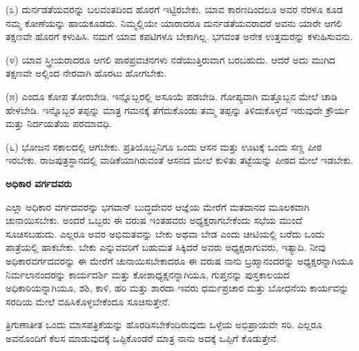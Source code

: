 \vspace{0.15cm}

(೩) ದುರ್ನಡತೆಯವರನ್ನು ಬಲವಂತದಿಂದ ಹೊರಗೆ ಇಟ್ಟಿರಬೇಕು. ಯಾವ ಕಾರಣದಿಂದಲೂ ಅವರ ನೆರಳೂ ಕೂಡ ನಮ್ಮ ಕೋಣೆಯನ್ನು ಹಾಯಕೂಡದು. ನಿಮ್ಮಲ್ಲಿಯೇ ಯಾರಾದರೂ ದುರ್ನಡತೆಯವರಾದರೆ ಅವನು ಯಾರೇ ಆಗಲಿ ತಕ್ಷಣವೇ ಹೊರಗೆ ಕಳುಹಿಸಿ. ನಮಗೆ ಯಾವ ಕಪಟಿಗಳೂ ಬೇಕಾಗಿಲ್ಲ. ಭಗವಂತ ಅನೇಕ ಉತ್ತಮರನ್ನು ಕಳುಹಿಸುವನು.

\vspace{0.15cm}

(೪) ಯಾವ ಸ್ತ್ರೀಯರಾದರೂ ಆಗಲಿ ಪಾಠಪ್ರವಚನಗಳು ನಡೆಯುತ್ತಿರುವಾಗ ಬರಬಹುದು. ಆದರೆ ಅದು ಮುಗಿದ ತಕ್ಷಣವೇ ಅಲ್ಲಿಂದ ನೇರವಾಗಿ ಹೊರಟು ಹೋಗಬೇಕು.

\vspace{0.15cm}

(೫) ಎಂದೂ ಕೋಪ ತೋರಬೇಡಿ. ಇನ್ನೊಬ್ಬರಲ್ಲಿ ಅಸೂಯೆ ಪಡಬೇಡಿ. ಗೋಪ್ಯವಾಗಿ ಮತ್ತೊಬ್ಬನ ಮೇಲೆ ಚಾಡಿ ಹೇಳಬೇಡಿ. ಇನ್ನೊಬ್ಬರ ತಪ್ಪನ್ನು ಮಾತ್ರ ಗಮನಕ್ಕೆ ತೆಗೆದುಕೊಂಡು ತಮ್ಮ ತಪ್ಪನ್ನು ತಿಳಿದುಕೊಳ್ಳದೆ ಇರುವುದೇ ಕ್ರೌರ್ಯ ಮತ್ತು ನಿರ್ದಯತೆಯ ಪರಮಾವಧಿ.

\vspace{0.15cm}

(೬) ಭೋಜನ ಸಕಾಲದಲ್ಲಿ ಆಗಬೇಕು. ಪ್ರತಿಯೊಬ್ಬನಿಗೂ ಒಂದು ಆಸನ ಮತ್ತು ಊಟಕ್ಕೆ ಒಂದು ಸಣ್ಣ ಪೀಠ ಇರಬೇಕು. ರಾಜಪುತ್ರಸ್ಥಾನದಲ್ಲಿ ವಾಡಿಕೆಯಾಗಿರುವಂತೆ ಆಸನದ ಮೇಲೆ ಕುಳಿತು ತಟ್ಟೆಯನ್ನು ಪೀಠದ ಮೇಲೆ ಇಡಬೇಕು.
\newpage

\begin{center}
\textbf{ಅಧಿಕಾರ ವರ್ಗದವರು}
\end{center}

\vspace{0.13cm}

ಎಲ್ಲಾ ಅಧಿಕಾರ ವರ್ಗದವರನ್ನು ಭಗವಾನ್ ಬುದ್ಧದೇವರ ಆಜ್ಞೆಯ ಮೇರೆಗೆ ಮತದಾನದ ಮೂಲಕವಾಗಿ ಚುನಾಯಿಸಬೇಕು. ಅಂದರೆ ಒಬ್ಬರು ಈ ವರುಷ ಇಂತಹವರು ಅಧ್ಯಕ್ಷರಾಗಬೇಕೆಂದು ಸಭೆಯ ಮುಂದೆ ಸೂಚಿಸಬಹುದು. ಎಲ್ಲರೂ ಅವರ ಅಭಿಮತವನ್ನು ಬೇಕು ಅಥವಾ ಬೇಡ ಎಂದು ಚೀಟಿಯಲ್ಲಿ ಬರೆದು ಒಂದು ಪಾತ್ರೆಯಲ್ಲಿ ಹಾಕಬೇಕು. ಬೇಕು ಎನ್ನುವವರಿಗೆ ಬಹುಮತ ಸಿಕ್ಕಿದರೆ ಅವರು ಅಧ್ಯಕ್ಷರಾಗುವರು, ಇತ್ಯಾದಿ. ನೀವು ಅಧಿಕಾರವರ್ಗದವರನ್ನು ಈ ಮೇರೆಗೆ ಚುನಾಯಿಸಬೇಕಾದರೂ ಈ ವರುಷ ನಾನು ಬ್ರಹ್ಮಾನಂದರನ್ನು ಅಧ್ಯಕ್ಷರನ್ನಾಗಿಯೂ ನಿರ್ಮಲಾನಂದರನ್ನು ಕಾರ್ಯದರ್ಶಿ ಮತ್ತು ಕೋಶಾಧ್ಯಕ್ಷನನ್ನಾಗಿಯೂ, ಗುಪ್ತನನ್ನು ಪುಸ್ತಕಾಲಯದ ಅಧಿಕಾರಿಯನ್ನಾಗಿಯೂ, ಶಶಿ, ಕಾಳಿ, ಹರಿ ಮತ್ತು ಶಾರದಾ ಇವರು ಧರ್ಮಪ್ರಚಾರ ಮತ್ತು ಬೋಧನೆಯ ಕಾರ್ಯವನ್ನು ಸರದಿಯ ಮೇಲೆ ವಹಿಸಿಕೊಳ್ಳಬೇಕೆಂದೂ ಸೂಚಿಸುತ್ತೇನೆ.

\vspace{0.4cm}

ತ್ರಿಗುಣಾತೀತ ಒಂದು ಮಾಸಪತ್ರಿಕೆಯನ್ನು ಹೊರಡಿಸಬೇಕೆಂದಿರುವುದು ಒಳ್ಳೆಯ ಅಭಿಪ್ರಾಯವೇ ಸರಿ. ಎಲ್ಲರೂ ಅವನೊಂದಿಗೆ ಕೆಲಸ ಮಾಡುವುದಕ್ಕೆ ಒಪ್ಪಿಕೊಂಡರೆ ಮಾತ್ರ ನಾನು ಅದಕ್ಕೆ ಒಪ್ಪಿಗೆ ಕೊಡುತ್ತೇನೆ.

\vspace{0.4cm}

